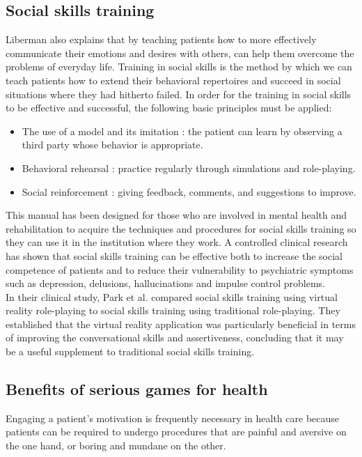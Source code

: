 \documentclass[11pt]{article}
\begin{document}
\subsection{Social skills training}
Liberman \cite{Liberman05} also explains that by teaching patients how to more effectively communicate their emotions and desires with others, can help them overcome the problems of everyday life. Training in social skills is the method by which we can teach patients how to extend their behavioral repertoires and succeed in social situations where they had hitherto failed.
In order for the training in social skills to be effective and successful, the following basic principles must be applied:
\begin{itemize}
\item The use of a model and its imitation : the patient can learn by observing a third party whose behavior is appropriate.
\item Behavioral rehearsal : practice regularly through simulations and role-playing.
\item Social reinforcement : giving feedback, comments, and suggestions to improve.
\end{itemize} 
This manual has been designed for those who are involved in mental health and rehabilitation to acquire the techniques and procedures for social skills training so they can use it in the institution where they work. A controlled clinical research has shown that social skills training can be effective both to increase the social competence of patients and to reduce their vulnerability to psychiatric symptoms such as depression, delusions, hallucinations and impulse control problems.\\

In their clinical study, Park et al. \cite{Park11} compared social skills training using virtual reality role-playing to social skills training using traditional role-playing. They established that the virtual reality application was particularly beneficial in terms of improving the conversational skills and assertiveness, concluding that it may be a useful supplement to traditional social skills training. 
\subsection{Benefits of serious games for health}
Engaging a patient’s motivation is frequently necessary in health care because patients can be required to undergo procedures that are painful and aversive on the one hand, or boring and mundane on the other.\\
\end{document}
